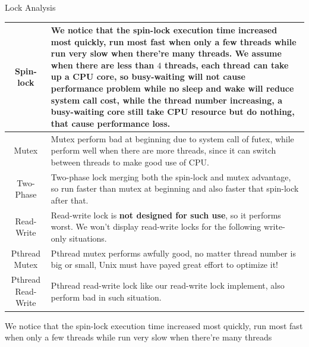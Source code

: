 \documentclass{article}
\begin{document}
\begin{center}
\centerline{Lock Analysis}
\begin{tabular}{c|p{}}
\hline
Spin-lock&
We notice that the spin-lock execution time increased most quickly, run most fast when only a few threads while run very slow when there're many threads. We assume when there are less than $4$ threads, each thread can take up a CPU core, so busy-waiting will not cause performance problem while no sleep and wake will reduce system call cost, while the thread number increasing, a busy-waiting core still take CPU resource but do nothing, that cause performance loss.\\
\hline
Mutex&
Mutex perform bad at beginning due to system call of futex, while perform well when there are more threads, since it can switch between threads to make good use of CPU.\\
\hline
Two-Phase&
Two-phase lock merging both the spin-lock and mutex advantage, so run faster than mutex at beginning and also faster that spin-lock after that.\\
\hline
Read-Write&
Read-write lock is \textbf{not designed for such use}, so it performs worst. We won't display read-write locks for the following write-only situations.\\
\hline
Pthread Mutex&
Pthread mutex performs awfully good, no matter thread number is big or small, Unix must have payed great effort to optimize it!\\
\hline
Pthread Read-Write&
Pthread read-write lock like our read-write lock implement, also perform bad in such situation.\\
\hline
\end{tabular}
\end{center}
We notice that the spin-lock execution time increased most quickly, run most fast when only a few threads while run very slow when there're many threads
\end{document}
